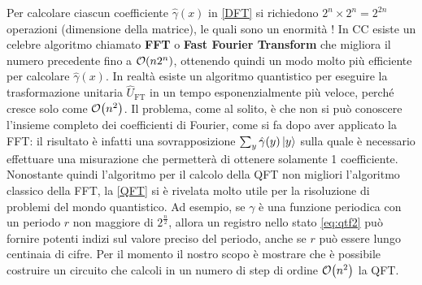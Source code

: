 \noindent Per calcolare ciascun coefficiente $\hat{\gamma}(x)$ in \eqref{DFT} si richiedono $2^n \times 2^n = 2^{2n}$ operazioni (dimensione della matrice), le quali sono un enormità ! In CC esiste un celebre algoritmo chiamato \textbf{FFT} o \textbf{Fast Fourier Transform} che migliora il numero precedente fino a $\order{n 2^n}$, ottenendo quindi un modo molto più efficiente per calcolare $\hat{\gamma}(x)$. In realtà esiste un algoritmo quantistico per eseguire la trasformazione unitaria $\hat U_{\text{FT}}$ in un tempo esponenzialmente più veloce, perché cresce solo come $\order{n^2}$. Il problema, come al solito, è che non si può conoscere l'insieme completo dei coefficienti di Fourier, come si fa dopo aver applicato la FFT: il risultato è infatti una sovrapposizione $\sum_y \hat{\gamma} (y) \ket{y}$ sulla quale è necessario effettuare una misurazione che permetterà di ottenere solamente 1 coefficiente. Nonostante quindi l'algoritmo per il calcolo della QFT non migliori l'algoritmo classico della FFT, la \eqref{QFT} si è rivelata molto utile per la risoluzione di problemi del mondo quantistico. Ad esempio, se $\gamma$ è una funzione periodica con un periodo $r$ non maggiore di $2^{\frac n2}$, allora un registro nello stato \eqref{eq:qtf2} può fornire potenti indizi sul valore preciso del periodo, anche se $r$ può essere lungo centinaia di cifre. Per il momento il nostro scopo è mostrare che è possibile costruire un circuito che calcoli in un numero di step di ordine $\order{n^2}$ la QFT.

